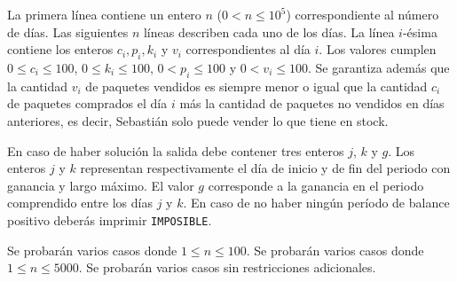 \documentclass{oci}
\begin{document}
\begin{inputDescription}
La primera línea contiene un entero $n$ ($0 < n \leq 10^5$) correspondiente al número de días.
Las siguientes $n$ líneas describen cada uno de los días.
La línea $i$-ésima contiene los enteros $c_i, p_i, k_i$ y $v_i$
correspondientes al día $i$.
Los valores cumplen $0 \leq c_i \leq 100$,  $ 0 \leq k_i \leq 100$, $0 < p_i \leq 100$ y $0 < v_i \leq 100$.
Se garantiza además que la cantidad $v_i$ de paquetes vendidos es siempre menor o igual
que la cantidad $c_i$ de paquetes comprados el día $i$ más la cantidad de paquetes no vendidos
en días anteriores, es decir, Sebastián solo puede vender lo que tiene en stock.
\end{inputDescription}

\begin{outputDescription}
En caso de haber solución la salida debe contener tres enteros $j$, $k$ y $g$.
Los enteros $j$ y $k$ representan respectivamente el día de inicio y de fin del periodo con ganancia
y largo máximo.
El valor $g$ corresponde a la ganancia en el periodo comprendido entre los días $j$ y $k$.
En caso de no haber ningún período de balance positivo deberás imprimir \verb|IMPOSIBLE|.
\end{outputDescription}

\begin{scoreDescription}
  Se probarán varios casos donde $1 \leq n \leq 100$.
  Se probarán varios casos donde $1 \leq n \leq 5000$.
  Se probarán varios casos sin restricciones adicionales.
\end{scoreDescription}

\begin{sampleDescription}
\end{sampleDescription}
\end{document}
